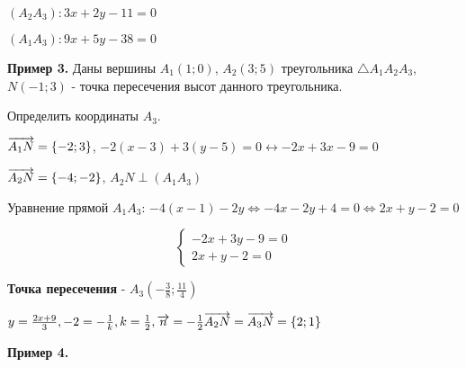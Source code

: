 \documentclass{article}
\def\vec{\ensuremath\overrightarrow}
\begin{document}
\begin{flushleft}
\hfill

$(A_2 A_3): 3x + 2y - 11 = 0$

\hfill 

$(A_1 A_3): 9x + 5y - 38 = 0$

\hfill

\textbf{Пример 3.} Даны вершины $A_1 (1; 0)$, $A_2(3; 5)$ треугольника $\triangle A_1 A_2 A_3$, $N(-1; 3)$ - точка пересечения высот данного треугольника.

Определить координаты $A_3$.

\hfill

$\vec{A_1 N} = \{ -2; 3 \}$, $-2 (x - 3) + 3 (y - 5) = 0 \longleftrightarrow -2x + 3x - 9 = 0$

$\vec{A_2 N} = \{ -4; -2 \}$, $A_2 N \perp (A_1 A_3)$

\hfill

Уравнение прямой $A_1 A_3$: $-4 (x - 1) - 2y \Longleftrightarrow -4x -2y + 4 = 0 \Longleftrightarrow 2x + y - 2 = 0$

\hfill

\begin{equation}
    \begin{cases}
        -2x + 3y - 9 = 0 \\
        2x + y - 2 = 0
    \end{cases}
\end{equation}

\textbf{Точка пересечения} - $A_3 (-\frac{3}{8}; \frac{11}{4})$ 

\hfill

$y = \frac{2x + 9}{3}, -2 = -\frac{1}{k}, k = \frac{1}{2}, \vec{n} = -\frac{1}{2} \vec{A_2 N} = \vec{A_3 N} = \{ 2; 1 \}$

\hfill

\textbf{Пример 4.} 

\end{flushleft}
\end{document}
